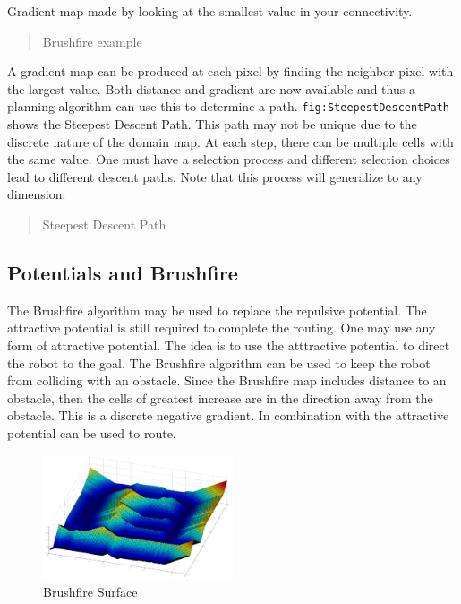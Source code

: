 Gradient map made by looking at the smallest value in your connectivity.

\begin{quote}
Brushfire example
\end{quote}

A gradient map can be produced at each pixel by finding the neighbor
pixel with the largest value. Both distance and gradient are now
available and thus a planning algorithm can use this to determine a
path. \texttt{fig:SteepestDescentPath} shows the Steepest Descent Path.
This path may not be unique due to the discrete nature of the domain
map. At each step, there can be multiple cells with the same value. One
must have a selection process and different selection choices lead to
different descent paths. Note that this process will generalize to any
dimension.

\begin{quote}
Steepest Descent Path
\end{quote}

\hypertarget{potentials-and-brushfire}{%
\subsection{Potentials and Brushfire}\label{potentials-and-brushfire}}

The Brushfire algorithm may be used to replace the repulsive potential.
The attractive potential is still required to complete the routing. One
may use any form of attractive potential. The idea is to use the
atttractive potential to direct the robot to the goal. The Brushfire
algorithm can be used to keep the robot from colliding with an obstacle.
Since the Brushfire map includes distance to an obstacle, then the cells
of greatest increase are in the direction away from the obstacle. This
is a discrete negative gradient. In combination with the attractive
potential can be used to route.

\begin{figure}
\centering
\includegraphics[width=0.5\textwidth,height=\textheight]{PlanningFigures/brushfiresurface.png}
\caption{Brushfire Surface}
\end{figure}


